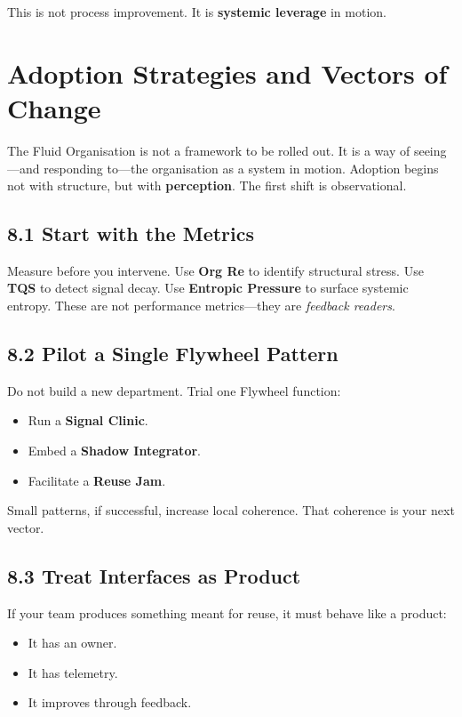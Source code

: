 \documentclass[12pt]{article}
\begin{document}
This is not process improvement. It is \textbf{systemic leverage} in motion.

\section{Adoption Strategies and Vectors of Change}

The Fluid Organisation is not a framework to be rolled out. It is a way of seeing—and responding to—the organisation as a system in motion. Adoption begins not with structure, but with \textbf{perception}. The first shift is observational.

\subsection*{8.1 Start with the Metrics}

Measure before you intervene. Use \textbf{Org Re} to identify structural stress. Use \textbf{TQS} to detect signal decay. Use \textbf{Entropic Pressure} to surface systemic entropy. These are not performance metrics—they are \textit{feedback readers}.

\subsection*{8.2 Pilot a Single Flywheel Pattern}

Do not build a new department. Trial one Flywheel function:
\begin{itemize}
    \item Run a \textbf{Signal Clinic}.
    \item Embed a \textbf{Shadow Integrator}.
    \item Facilitate a \textbf{Reuse Jam}.
\end{itemize}

Small patterns, if successful, increase local coherence. That coherence is your next vector.

\subsection*{8.3 Treat Interfaces as Product}

If your team produces something meant for reuse, it must behave like a product:
\begin{itemize}
    \item It has an owner.
    \item It has telemetry.
    \item It improves through feedback.
\end{itemize}
\end{document}
